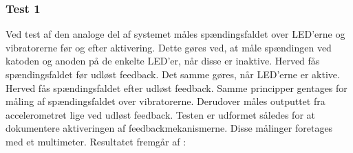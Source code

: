 \subsubsection{Test 1}
Ved test af den analoge del af systemet måles spændingsfaldet over LED'erne og vibratorerne før og efter aktivering. Dette gøres ved, at måle spændingen ved katoden og anoden på de enkelte LED'er, når disse er inaktive. Herved fås spændingsfaldet før udløst feedback. Det samme gøres, når LED'erne er aktive. Herved fås spændingsfaldet efter udløst feedback. Samme principper gentages for måling af spændingsfaldet over vibratorerne. Derudover måles outputtet fra accelerometret lige ved udløst feedback. Testen er udformet således for at dokumentere aktiveringen af feedbackmekanismerne. Disse målinger foretages med et multimeter. Resultatet fremgår af :
